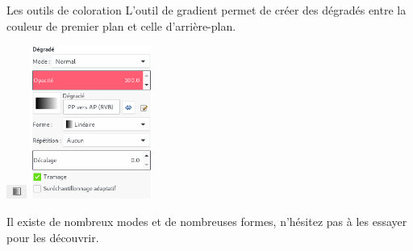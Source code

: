 \documentclass[10pt,svgnames,usenames,table]{beamer}
\begin{document}
\begin{frame}[allowframebreaks]{Les outils de coloration}
	\framebreak
	L'outil de gradient permet de créer des dégradés entre la couleur de premier plan et celle d'arrière-plan.
	\begin{center}
		\includegraphics[width=0.05\textwidth]{Images/color_tool_2.png}
		\includegraphics[width=0.3\textwidth]{Images/color_tool_2_settings.png}
	\end{center}
	Il existe de nombreux modes et de nombreuses formes, n'hésitez pas à les essayer pour les découvrir. 
	
\end{frame}
\end{document}
